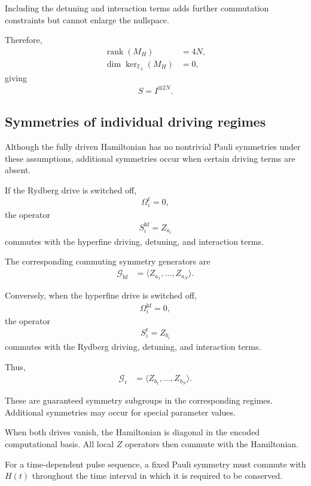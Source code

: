 \documentclass[amssymb,twocolumn,aps]{revtex4-2}
\begin{document}
Including the detuning and interaction
terms adds further commutation constraints
but cannot enlarge the nullspace.

Therefore,
\begin{align*}
    \operatorname{rank}(M_H)&=4N,\\
    \dim\ker_{\mathbb{F}_2}(M_H)&=0,
\end{align*}
giving
\begin{align*}
    S=I^{\otimes 2N}.
\end{align*}

\subsection*{Symmetries of individual driving regimes}

Although the fully driven Hamiltonian has
no nontrivial Pauli symmetries under these
assumptions, additional symmetries occur
when certain driving terms are absent.

If the Rydberg drive is switched off,
\begin{align*}
    \Omega_i^{\mathrm{r}}=0,
\end{align*}
the operator
\begin{align*}
    S_i^{\mathrm{hf}}=Z_{a_i}
\end{align*}
commutes with the hyperfine driving,
detuning, and interaction terms.

The corresponding commuting symmetry
generators are
\begin{align*}
    \mathcal{G}_{\mathrm{hf}}
    &=\langle Z_{a_1},\ldots,Z_{a_N}\rangle.
\end{align*}

Conversely, when the hyperfine drive
is switched off,
\begin{align*}
    \Omega_i^{\mathrm{hf}}=0,
\end{align*}
the operator
\begin{align*}
    S_i^{\mathrm{r}}=Z_{b_i}
\end{align*}
commutes with the Rydberg driving,
detuning, and interaction terms.

Thus,
\begin{align*}
    \mathcal{G}_{\mathrm{r}}
    &=\langle Z_{b_1},\ldots,Z_{b_N}\rangle.
\end{align*}

These are guaranteed symmetry subgroups
in the corresponding regimes. Additional
symmetries may occur for special parameter
values.

When both drives vanish, the Hamiltonian
is diagonal in the encoded computational
basis. All local $Z$ operators then commute
with the Hamiltonian.

For a time-dependent pulse sequence, a
fixed Pauli symmetry must commute with
$H(t)$ throughout the time interval in
which it is required to be conserved.
\end{document}
